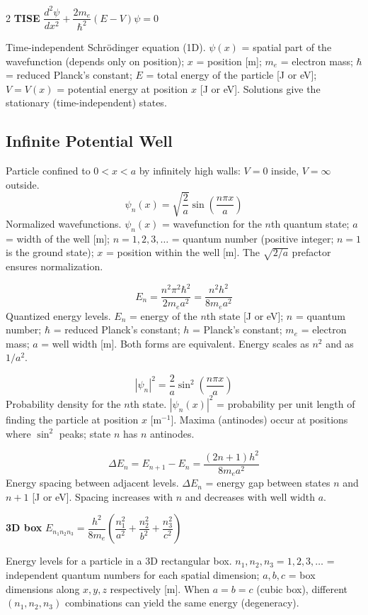 \documentclass[9pt]{extarticle}
\newcommand{\eqlabel}[1]{\textbf{\scriptsize #1}\;}
\newcommand{\desc}[1]{{\small\color{desc}#1}}
\begin{document}
\begin{multicols}{2}
\eqlabel{TISE}
$\dfrac{d^2\psi}{dx^2} + \dfrac{2m_e}{\hbar^2}(E - V)\psi = 0$

\desc{Time-independent Schr\"odinger equation (1D). $\psi(x)$ = spatial part of the wavefunction (depends only on position); $x$ = position [m]; $m_e$ = electron mass; $\hbar$ = reduced Planck's constant; $E$ = total energy of the particle [J or eV]; $V = V(x)$ = potential energy at position $x$ [J or eV]. Solutions give the stationary (time-independent) states.}

\subsection{Infinite Potential Well}
\desc{Particle confined to $0 < x < a$ by infinitely high walls: $V = 0$ inside, $V = \infty$ outside.}
\[\psi_n(x) = \sqrt{\frac{2}{a}}\sin\!\left(\frac{n\pi x}{a}\right)\]
\desc{Normalized wavefunctions. $\psi_n(x)$ = wavefunction for the $n$th quantum state; $a$ = width of the well [m]; $n = 1, 2, 3, \ldots$ = quantum number (positive integer; $n = 1$ is the ground state); $x$ = position within the well [m]. The $\sqrt{2/a}$ prefactor ensures normalization.}

\[E_n = \frac{n^2\pi^2\hbar^2}{2m_ea^2} = \frac{n^2 h^2}{8m_ea^2}\]
\desc{Quantized energy levels. $E_n$ = energy of the $n$th state [J or eV]; $n$ = quantum number; $\hbar$ = reduced Planck's constant; $h$ = Planck's constant; $m_e$ = electron mass; $a$ = well width [m]. Both forms are equivalent. Energy scales as $n^2$ and as $1/a^2$.}

\[|\psi_n|^2 = \frac{2}{a}\sin^2\!\left(\frac{n\pi x}{a}\right)\]
\desc{Probability density for the $n$th state. $|\psi_n(x)|^2$ = probability per unit length of finding the particle at position $x$ [m$^{-1}$]. Maxima (antinodes) occur at positions where $\sin^2$ peaks; state $n$ has $n$ antinodes.}

\[\Delta E_n = E_{n+1} - E_n = \frac{(2n+1)h^2}{8m_ea^2}\]
\desc{Energy spacing between adjacent levels. $\Delta E_n$ = energy gap between states $n$ and $n+1$ [J or eV]. Spacing increases with $n$ and decreases with well width $a$.}

\eqlabel{3D box}
$E_{n_1n_2n_3} = \dfrac{h^2}{8m_e}\!\left(\dfrac{n_1^2}{a^2}+\dfrac{n_2^2}{b^2}+\dfrac{n_3^2}{c^2}\right)$

\desc{Energy levels for a particle in a 3D rectangular box. $n_1, n_2, n_3 = 1, 2, 3, \ldots$ = independent quantum numbers for each spatial dimension; $a, b, c$ = box dimensions along $x, y, z$ respectively [m]. When $a = b = c$ (cubic box), different $(n_1, n_2, n_3)$ combinations can yield the same energy (degeneracy).}


\end{multicols}
\end{document}
